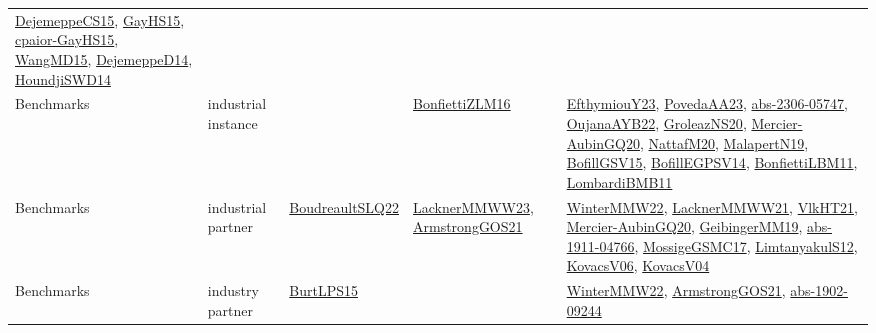 {\begin{longtable}{llp{6cm}p{6cm}p{6cm}}
\href{papers/DejemeppeCS15.pdf}{DejemeppeCS15}\cite{DejemeppeCS15}, \href{papers/GayHS15.pdf}{GayHS15}\cite{GayHS15}, \href{papers/cpaior-GayHS15.pdf}{cpaior-GayHS15}\cite{cpaior-GayHS15}, \href{articles/WangMD15.pdf}{WangMD15}\cite{WangMD15}, \href{papers/DejemeppeD14.pdf}{DejemeppeD14}\cite{DejemeppeD14}, \href{papers/HoundjiSWD14.pdf}{HoundjiSWD14}\cite{HoundjiSWD14}\\
Benchmarks & industrial instance &  & \href{papers/BonfiettiZLM16.pdf}{BonfiettiZLM16}\cite{BonfiettiZLM16} & \href{papers/EfthymiouY23.pdf}{EfthymiouY23}\cite{EfthymiouY23}, \href{papers/PovedaAA23.pdf}{PovedaAA23}\cite{PovedaAA23}, \href{articles/abs-2306-05747.pdf}{abs-2306-05747}\cite{abs-2306-05747}, \href{papers/OujanaAYB22.pdf}{OujanaAYB22}\cite{OujanaAYB22}, \href{papers/GroleazNS20.pdf}{GroleazNS20}\cite{GroleazNS20}, \href{papers/Mercier-AubinGQ20.pdf}{Mercier-AubinGQ20}\cite{Mercier-AubinGQ20}, \href{papers/NattafM20.pdf}{NattafM20}\cite{NattafM20}, \href{papers/MalapertN19.pdf}{MalapertN19}\cite{MalapertN19}, \href{papers/BofillGSV15.pdf}{BofillGSV15}\cite{BofillGSV15}, \href{papers/BofillEGPSV14.pdf}{BofillEGPSV14}\cite{BofillEGPSV14}, \href{papers/BonfiettiLBM11.pdf}{BonfiettiLBM11}\cite{BonfiettiLBM11}, \href{papers/LombardiBMB11.pdf}{LombardiBMB11}\cite{LombardiBMB11}\\
Benchmarks & industrial partner & \href{papers/BoudreaultSLQ22.pdf}{BoudreaultSLQ22}\cite{BoudreaultSLQ22} & \href{articles/LacknerMMWW23.pdf}{LacknerMMWW23}\cite{LacknerMMWW23}, \href{papers/ArmstrongGOS21.pdf}{ArmstrongGOS21}\cite{ArmstrongGOS21} & \href{papers/WinterMMW22.pdf}{WinterMMW22}\cite{WinterMMW22}, \href{papers/LacknerMMWW21.pdf}{LacknerMMWW21}\cite{LacknerMMWW21}, \href{articles/VlkHT21.pdf}{VlkHT21}\cite{VlkHT21}, \href{papers/Mercier-AubinGQ20.pdf}{Mercier-AubinGQ20}\cite{Mercier-AubinGQ20}, \href{papers/GeibingerMM19.pdf}{GeibingerMM19}\cite{GeibingerMM19}, \href{articles/abs-1911-04766.pdf}{abs-1911-04766}\cite{abs-1911-04766}, \href{papers/MossigeGSMC17.pdf}{MossigeGSMC17}\cite{MossigeGSMC17}, \href{articles/LimtanyakulS12.pdf}{LimtanyakulS12}\cite{LimtanyakulS12}, \href{papers/KovacsV06.pdf}{KovacsV06}\cite{KovacsV06}, \href{papers/KovacsV04.pdf}{KovacsV04}\cite{KovacsV04}\\
Benchmarks & industry partner & \href{papers/BurtLPS15.pdf}{BurtLPS15}\cite{BurtLPS15} &  & \href{papers/WinterMMW22.pdf}{WinterMMW22}\cite{WinterMMW22}, \href{papers/ArmstrongGOS21.pdf}{ArmstrongGOS21}\cite{ArmstrongGOS21}, \href{articles/abs-1902-09244.pdf}{abs-1902-09244}\cite{abs-1902-09244}\\

\end{longtable}}
